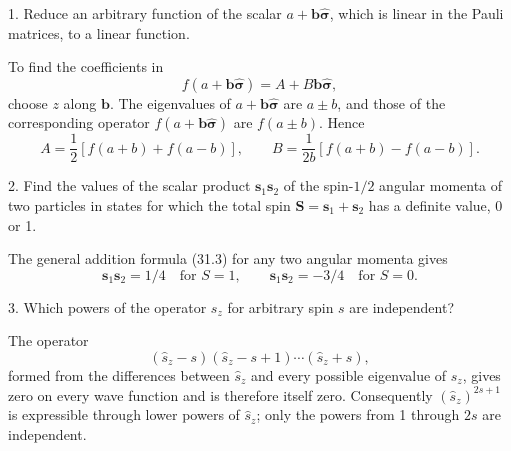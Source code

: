 \ProblemHeading

1. Reduce an arbitrary function of the scalar
$a+\mathbf b\hat{\boldsymbol\sigma}$, which is linear in the Pauli matrices,
to a linear function.

\SolutionHeading

To find the coefficients in
\[
 f(a+\mathbf b\hat{\boldsymbol\sigma})=A+B\mathbf b\hat{\boldsymbol\sigma},
\]
choose $z$ along $\mathbf b$. The eigenvalues of
$a+\mathbf b\hat{\boldsymbol\sigma}$ are $a\pm b$, and those of the
corresponding operator $f(a+\mathbf b\hat{\boldsymbol\sigma})$ are
$f(a\pm b)$. Hence
\[
 A=\frac12[f(a+b)+f(a-b)],\qquad
 B=\frac1{2b}[f(a+b)-f(a-b)].
\]

2. Find the values of the scalar product $\mathbf s_1\mathbf s_2$ of the
spin-$1/2$ angular momenta of two particles in states for which the total spin
$\mathbf S=\mathbf s_1+\mathbf s_2$ has a definite value, 0 or 1.

\SolutionHeading

The general addition formula (31.3) for any two angular momenta gives
\[
 \mathbf s_1\mathbf s_2=1/4\quad\text{for }S=1,\qquad
 \mathbf s_1\mathbf s_2=-3/4\quad\text{for }S=0.
\]

3. Which powers of the operator $s_z$ for arbitrary spin $s$ are independent?

\SolutionHeading

The operator
\[
 (\hat s_z-s)(\hat s_z-s+1)\cdots(\hat s_z+s),
\]
formed from the differences between $\hat s_z$ and every possible eigenvalue
of $s_z$, gives zero on every wave function and is therefore itself
zero. Consequently $(\hat s_z)^{2s+1}$ is
expressible through lower powers of $\hat s_z$; only the powers from 1 through
$2s$ are independent.
